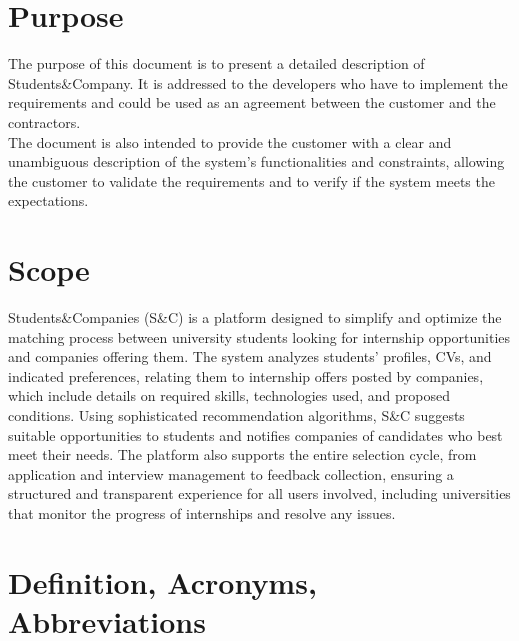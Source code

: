 \section{Purpose}
\label{sec:purpose}%
The purpose of this document is to present a detailed description of Students\&Company.
It is addressed to the developers who have to implement the requirements and could be used as an agreement between the customer and the contractors.\\ 
The document is also intended to provide the customer with a clear and unambiguous description of the system's functionalities and constraints, allowing the customer to validate the requirements and to verify if the system meets the expectations.

\section{Scope}
\label{sec:scope}%
Students\&Companies (S\&C) is a platform designed to simplify and optimize the matching process between university students looking for internship opportunities and companies offering them. The system analyzes students' profiles, CVs, and indicated preferences, relating them to internship offers posted by companies, which include details on required skills, technologies used, and proposed conditions. Using sophisticated recommendation algorithms, S\&C suggests suitable opportunities to students and notifies companies of candidates who best meet their needs. The platform also supports the entire selection cycle, from application and interview management to feedback collection, ensuring a structured and transparent experience for all users involved, including universities that monitor the progress of internships and resolve any issues.



\section{Definition, Acronyms, Abbreviations}
\label{sec:definition_acronyms_abbreviations}%


